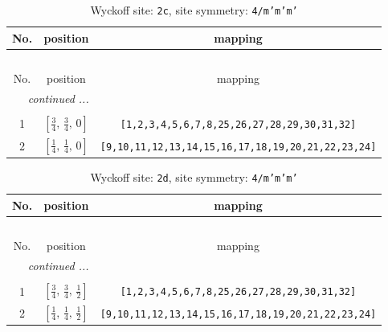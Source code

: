 \documentclass[fleqn,8pt]{jsarticle}
\begin{document}
\renewcommand{\arraystretch}{1.2}
\begin{longtable}{ccc}
\caption{Wyckoff site: {\tt 2c}, site symmetry: {\tt 4/m'm'm'}}
 \\
 \hline \hline
No. & position & mapping \\ \hline \endfirsthead

\multicolumn{2}{l}{\tablename\ \thetable{}} \\
 \hline \hline
No. & position & mapping \\ \hline \endhead

 \hline \hline
\multicolumn{2}{r}{\footnotesize\it continued ...} \\ \endfoot

 \hline \hline
\multicolumn{2}{r}{} \\ \endlastfoot

1 & $\left[ \frac{3}{4},\, \frac{3}{4},\, 0 \right]$ & {\tt [1,2,3,4,5,6,7,8,25,26,27,28,29,30,31,32]} \\ \hline
2 & $\left[ \frac{1}{4},\, \frac{1}{4},\, 0 \right]$ & {\tt [9,10,11,12,13,14,15,16,17,18,19,20,21,22,23,24]} \\
\end{longtable}
\renewcommand{\arraystretch}{1.2}
\begin{longtable}{ccc}
\caption{Wyckoff site: {\tt 2d}, site symmetry: {\tt 4/m'm'm'}}
 \\
 \hline \hline
No. & position & mapping \\ \hline \endfirsthead

\multicolumn{2}{l}{\tablename\ \thetable{}} \\
 \hline \hline
No. & position & mapping \\ \hline \endhead

 \hline \hline
\multicolumn{2}{r}{\footnotesize\it continued ...} \\ \endfoot

 \hline \hline
\multicolumn{2}{r}{} \\ \endlastfoot

1 & $\left[ \frac{3}{4},\, \frac{3}{4},\, \frac{1}{2} \right]$ & {\tt [1,2,3,4,5,6,7,8,25,26,27,28,29,30,31,32]} \\ \hline
2 & $\left[ \frac{1}{4},\, \frac{1}{4},\, \frac{1}{2} \right]$ & {\tt [9,10,11,12,13,14,15,16,17,18,19,20,21,22,23,24]} \\
\end{longtable}
\renewcommand{\arraystretch}{1.2}
\end{document}
